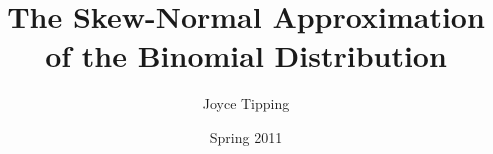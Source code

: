 \documentclass{beamer}
\theoremstyle{plain}
\begin{document}
\title[The Skew-Normal Approx of the Binomial]{The Skew-Normal Approximation\\of the Binomial Distribution}
\author{Joyce Tipping}
\date{Spring 2011}
\end{document}

